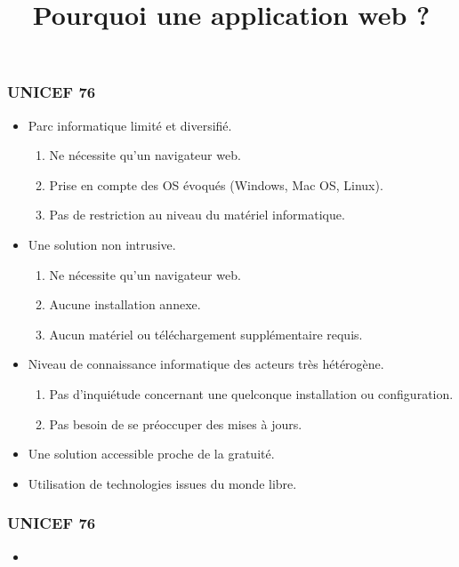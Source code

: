 \subsection{} %

\title{Pourquoi une application web ?}

\begin{frame}
  \frametitle{UNICEF 76}
  \begin{itemize}
    \item Parc informatique limité et diversifié.
      \begin{enumerate}
        \item Ne nécessite qu'un navigateur web.
        \item Prise en compte des OS évoqués (Windows, Mac OS, Linux).
        \item Pas de restriction au niveau du matériel informatique.
      \end{enumerate}
    \item Une solution non intrusive.
      \begin{enumerate}
        \item Ne nécessite qu'un navigateur web.
        \item Aucune installation annexe.
        \item Aucun matériel ou téléchargement supplémentaire requis.
      \end{enumerate}
    \item Niveau de connaissance informatique des acteurs très hétérogène.
      \begin{enumerate}
        \item Pas d'inquiétude concernant une quelconque installation ou configuration.
        \item Pas besoin de se préoccuper des mises à jours.  
      \end{enumerate}
    \item Une solution accessible proche de la gratuité.
    \item Utilisation de technologies issues du monde libre.
  \end{itemize}
\end{frame}

\begin{frame}
  \frametitle{UNICEF 76}
  \begin{itemize}
    \item
  \end{itemize}
\end{frame}
